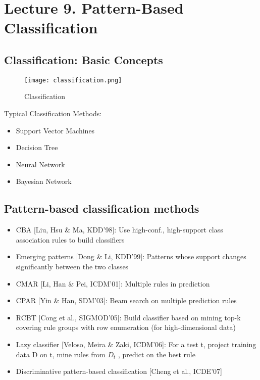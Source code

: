 \section{Lecture 9. Pattern-Based Classification}

\subsection{Classification: Basic Concepts}

\begin{figure}[H]
    \centering
    \texttt{[image: classification.png]}
    \caption{Classification}
\end{figure}

Typical Classification Methods:
\begin{itemize}
\item Support Vector Machines
\item Decision Tree
\item Neural Network
\item Bayesian Network
\end{itemize}

\subsection{Pattern-based classification methods}
\begin{itemize}
\item CBA [Liu, Hsu \& Ma, KDD’98]: Use high-conf., high-support class association rules to build classifiers
\item Emerging patterns [Dong \& Li, KDD’99]: Patterns whose support changes significantly between the two classes
\item CMAR [Li, Han \& Pei, ICDM’01]: Multiple rules in prediction
\item CPAR [Yin \& Han, SDM’03]: Beam search on multiple prediction rules
\item RCBT [Cong et al., SIGMOD’05]: Build classifier based on mining top-k covering rule groups with row enumeration (for high-dimensional data)
\item Lazy classifier [Veloso, Meira \& Zaki, ICDM’06]: For a test t, project training data D on t, mine rules from $D_t$ , predict on the best rule
\item Discriminative pattern-based classification [Cheng et al., ICDE’07]
\end{itemize}

